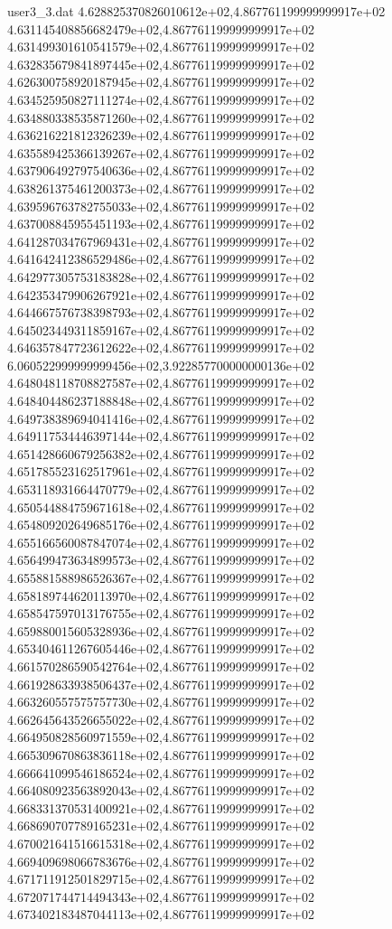 \begin{filecontents}{user3_3.dat}
4.628825370826010612e+02,4.867761199999999917e+02
4.631145408856682479e+02,4.867761199999999917e+02
4.631499301610541579e+02,4.867761199999999917e+02
4.632835679841897445e+02,4.867761199999999917e+02
4.626300758920187945e+02,4.867761199999999917e+02
4.634525950827111274e+02,4.867761199999999917e+02
4.634880338535871260e+02,4.867761199999999917e+02
4.636216221812326239e+02,4.867761199999999917e+02
4.635589425366139267e+02,4.867761199999999917e+02
4.637906492797540636e+02,4.867761199999999917e+02
4.638261375461200373e+02,4.867761199999999917e+02
4.639596763782755033e+02,4.867761199999999917e+02
4.637008845955451193e+02,4.867761199999999917e+02
4.641287034767969431e+02,4.867761199999999917e+02
4.641642412386529486e+02,4.867761199999999917e+02
4.642977305753183828e+02,4.867761199999999917e+02
4.642353479906267921e+02,4.867761199999999917e+02
4.644667576738398793e+02,4.867761199999999917e+02
4.645023449311859167e+02,4.867761199999999917e+02
4.646357847723612622e+02,4.867761199999999917e+02
6.060522999999999456e+02,3.922857700000000136e+02
4.648048118708827587e+02,4.867761199999999917e+02
4.648404486237188848e+02,4.867761199999999917e+02
4.649738389694041416e+02,4.867761199999999917e+02
4.649117534446397144e+02,4.867761199999999917e+02
4.651428660679256382e+02,4.867761199999999917e+02
4.651785523162517961e+02,4.867761199999999917e+02
4.653118931664470779e+02,4.867761199999999917e+02
4.650544884759671618e+02,4.867761199999999917e+02
4.654809202649685176e+02,4.867761199999999917e+02
4.655166560087847074e+02,4.867761199999999917e+02
4.656499473634899573e+02,4.867761199999999917e+02
4.655881588986526367e+02,4.867761199999999917e+02
4.658189744620113970e+02,4.867761199999999917e+02
4.658547597013176755e+02,4.867761199999999917e+02
4.659880015605328936e+02,4.867761199999999917e+02
4.653404611267605446e+02,4.867761199999999917e+02
4.661570286590542764e+02,4.867761199999999917e+02
4.661928633938506437e+02,4.867761199999999917e+02
4.663260557575757730e+02,4.867761199999999917e+02
4.662645643526655022e+02,4.867761199999999917e+02
4.664950828560971559e+02,4.867761199999999917e+02
4.665309670863836118e+02,4.867761199999999917e+02
4.666641099546186524e+02,4.867761199999999917e+02
4.664080923563892043e+02,4.867761199999999917e+02
4.668331370531400921e+02,4.867761199999999917e+02
4.668690707789165231e+02,4.867761199999999917e+02
4.670021641516615318e+02,4.867761199999999917e+02
4.669409698066783676e+02,4.867761199999999917e+02
4.671711912501829715e+02,4.867761199999999917e+02
4.672071744714494343e+02,4.867761199999999917e+02
4.673402183487044113e+02,4.867761199999999917e+02

\end{filecontents}
